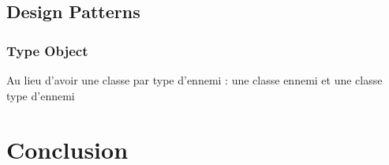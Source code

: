 \documentclass[pdf]{beamer}
\begin{document}
\subsection{Design Patterns}

\begin{frame}
  \frametitle{Type Object}
  Au lieu d'avoir une classe par type d'ennemi : une classe ennemi et une classe type d'ennemi
\end{frame}


\section{Conclusion}
\end{document}
